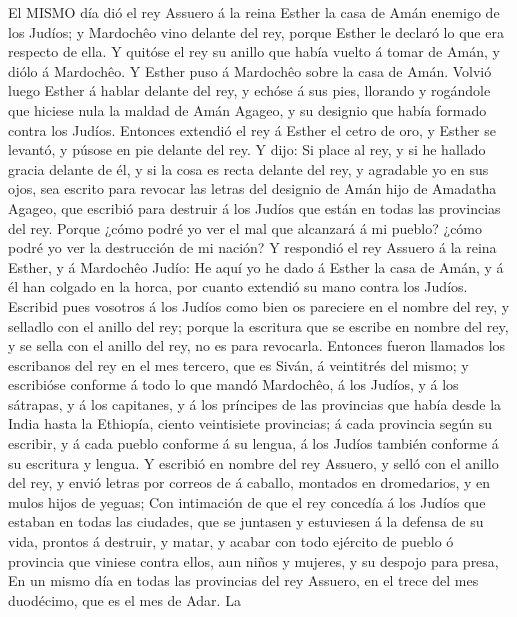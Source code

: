  El MISMO día dió el rey Assuero á la reina Esther la casa
de Amán enemigo de los Judíos; y Mardochêo vino delante del rey, porque
Esther le declaró lo que era respecto de ella.  Y quitóse el
rey su anillo que había vuelto á tomar de Amán, y diólo á Mardochêo. Y
Esther puso á Mardochêo sobre la casa de Amán.  Volvió luego
Esther á hablar delante del rey, y echóse á sus pies, llorando y
rogándole que hiciese nula la maldad de Amán Agageo, y su designio que
había formado contra los Judíos.  Entonces extendió el rey á
Esther el cetro de oro, y Esther se levantó, y púsose en pie delante del
rey.  Y dijo: Si place al rey, y si he hallado gracia
delante de él, y si la cosa es recta delante del rey, y agradable yo en
sus ojos, sea escrito para revocar las letras del designio de Amán hijo
de Amadatha Agageo, que escribió para destruir á los Judíos que están en
todas las provincias del rey.  Porque ¿cómo podré yo ver el
mal que alcanzará á mi pueblo? ¿cómo podré yo ver la destrucción de mi
nación?  Y respondió el rey Assuero á la reina Esther, y á
Mardochêo Judío: He aquí yo he dado á Esther la casa de Amán, y á él han
colgado en la horca, por cuanto extendió su mano contra los Judíos.
 Escribid pues vosotros á los Judíos como bien os pareciere
en el nombre del rey, y selladlo con el anillo del rey; porque la
escritura que se escribe en nombre del rey, y se sella con el anillo del
rey, no es para revocarla.  Entonces fueron llamados los
escribanos del rey en el mes tercero, que es Siván, á veintitrés del
mismo; y escribióse conforme á todo lo que mandó Mardochêo, á los
Judíos, y á los sátrapas, y á los capitanes, y á los príncipes de las
provincias que había desde la India hasta la Ethiopía, ciento
veintisiete provincias; á cada provincia según su escribir, y á cada
pueblo conforme á su lengua, á los Judíos también conforme á su
escritura y lengua.  Y escribió en nombre del rey Assuero,
y selló con el anillo del rey, y envió letras por correos de á caballo,
montados en dromedarios, y en mulos hijos de yeguas;  Con
intimación de que el rey concedía á los Judíos que estaban en todas las
ciudades, que se juntasen y estuviesen á la defensa de su vida, prontos
á destruir, y matar, y acabar con todo ejército de pueblo ó provincia
que viniese contra ellos, aun niños y mujeres, y su despojo para presa,
 En un mismo día en todas las provincias del rey Assuero,
en el trece del mes duodécimo, que es el mes de Adar.  La
